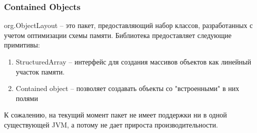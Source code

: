 \subsubsection{Contained Objects}
org.ObjectLayout -- это пакет, предоставляющий набор классов, разработанных с учетом оптимизации схемы памяти\cite{contained-obj}.
Библиотека предоставляет следующие примитивы:
\begin{enumerate}
	\item StructuredArray -- интерфейс для создания массивов объектов как линейный участок памяти. 
	\item Contained object -- позволяет создавать объекты со "встроенными" в них полями
\end{enumerate}
К сожалению, на текущий момент пакет не имеет поддержки ни в одной существующей JVM, а потому не дает прироста производительности. 

